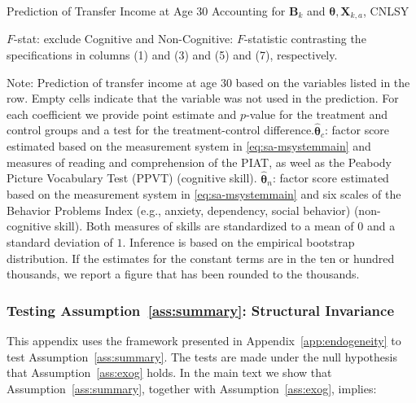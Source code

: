\begin{table}
\begin{threeparttable}
\caption{Prediction of Transfer Income at Age 30 Accounting for $\bm{B}_k$ and $\bm{\theta}, \bm{X}_{k,a}$, CNLSY} \label{table:trincome}
\centering
\footnotesize

\begin{tablenotes}
\footnotesize
\item $F$-stat: exclude Cognitive and Non-Cognitive: $F$-statistic contrasting the specifications in columns (1) and (3) and (5) and (7), respectively.\\
\item Note: Prediction of transfer income at age 30 based on the variables listed in the row. Empty cells indicate that the variable was not used in the prediction. For each coefficient we provide point estimate and $p$-value for the treatment and control groups and a test for the treatment-control difference.$\hat{\bm{\theta}}_{c}$: factor score estimated based on the measurement system in \eqref{eq:sa-msystemmain} and measures of reading and comprehension of the PIAT, as weel as the Peabody Picture Vocabulary Test (PPVT) (cognitive skill). $\hat{\bm{\theta}}_{n}$: factor score estimated based on the measurement system in \eqref{eq:sa-msystemmain} and six scales of the Behavior Problems Index (e.g., anxiety, dependency, social behavior) (non-cognitive skill).  Both measures of skills are standardized to a mean of $0$ and a standard deviation of $1$. Inference is based on the empirical bootstrap distribution. If the estimates for the constant terms are in the ten or hundred thousands, we report a figure that has been rounded to the thousands.
\end{tablenotes}
\end{threeparttable}
\end{table}

\subsubsection{Testing Assumption~\ref{ass:summary}: Structural Invariance} \label{app:invariance}

This appendix uses the framework presented in Appendix~\ref{app:endogeneity} to test Assumption~\ref{ass:summary}. The tests are made under the null hypothesis that Assumption~\ref{ass:exog} holds. In the main text we show that Assumption~\ref{ass:summary}, together with Assumption~\ref{ass:exog}, implies:

